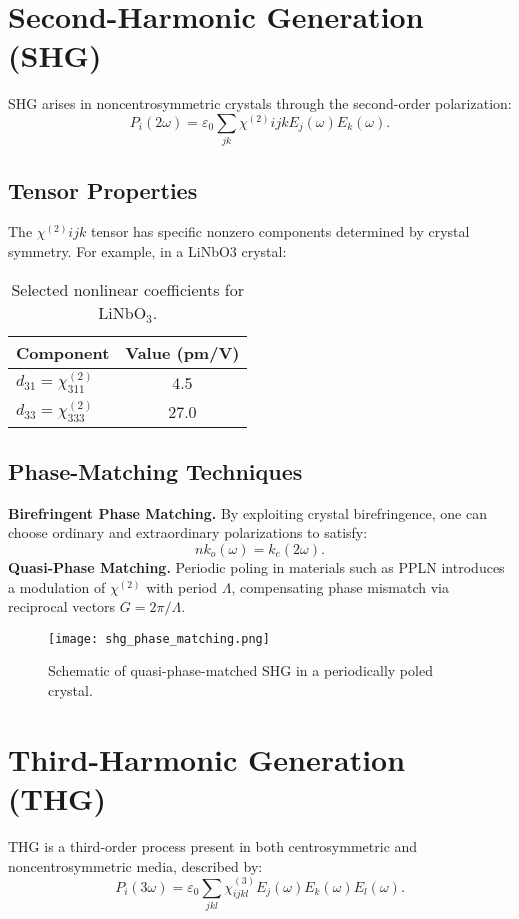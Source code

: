 \documentclass[12pt,a4paper]{article}
\begin{document}
\section{Second-Harmonic Generation (SHG)}
SHG arises in noncentrosymmetric crystals through the second-order polarization:
\begin{equation}
P_i(2\omega) = \varepsilon_0 \sum_{jk} \chi^{(2)}{ijk} E_j(\omega)E_k(\omega).
\end{equation}
\subsection{Tensor Properties}
The $\chi^{(2)}{ijk}$ tensor has specific nonzero components determined by crystal symmetry. For example, in a LiNbO$3$ crystal:
\begin{table}[h!]
\centering
\begin{tabular}{lc}
\toprule
Component & Value (pm/V) \\
\midrule
$d_{31} = \chi^{(2)}_{311}$ & 4.5 \\
$d_{33} = \chi^{(2)}_{333}$ & 27.0 \\
\bottomrule
\end{tabular}
\caption{Selected nonlinear coefficients for LiNbO$_3$.}
\end{table}

\subsection{Phase-Matching Techniques}
\textbf{Birefringent Phase Matching.} By exploiting crystal birefringence, one can choose ordinary and extraordinary polarizations to satisfy:
\begin{equation}
n k_o(\omega) = k_e(2\omega).
\end{equation}
\textbf{Quasi-Phase Matching.} Periodic poling in materials such as PPLN introduces a modulation of $\chi^{(2)}$ with period $\Lambda$, compensating phase mismatch via reciprocal vectors $G = 2\pi/\Lambda$.

\begin{figure}[h!]
\centering
\texttt{[image: shg\_phase\_matching.png]}
\caption{Schematic of quasi-phase-matched SHG in a periodically poled crystal.}
\end{figure}

\section{Third-Harmonic Generation (THG)}
THG is a third-order process present in both centrosymmetric and noncentrosymmetric media, described by:
\begin{equation}
P_i(3\omega) = \varepsilon_0 \sum_{jkl} \chi^{(3)}_{ijkl} E_j(\omega)E_k(\omega)E_l(\omega).
\end{equation}
\end{document}
